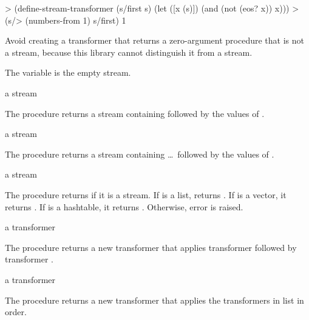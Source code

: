 \codebegin
> (define-stream-transformer (s/first s)
    (let ([x (s)])
      (and (not (eos? x)) x)))
> (s/> (numbers-from 1) s/first)
1
\codeend

Avoid creating a transformer that returns a zero-argument procedure that is not a stream,
because this library cannot distinguish it from a stream.

\begin{variable}
\end{variable}
\antipar

The  variable is the empty stream.

\begin{procedure}
\end{procedure}
\returns{} a stream

The  procedure returns a stream containing  followed by the
values of .

\begin{procedure}
\end{procedure}
\returns{} a stream

The  procedure returns a stream containing  \ldots\ followed by
the values of .

\begin{procedure}
\end{procedure}
\returns{} a stream

The  procedure returns  if it is a stream. If  is a
list,  returns . If  is a vector,
it returns . If  is a hashtable, it returns
. Otherwise, error  is
raised.

\begin{procedure}
\end{procedure}
\returns{} a transformer

The  procedure returns a new transformer that applies
transformer  followed by transformer .

\begin{procedure}
\end{procedure}
\returns{} a transformer

The  procedure returns a new transformer that applies the
transformers in list  in order.
